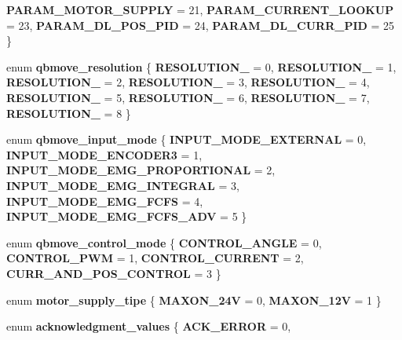\begin{DoxyCompactItemize}
\newline
\textbf{ P\+A\+R\+A\+M\+\_\+\+M\+O\+T\+O\+R\+\_\+\+S\+U\+P\+P\+LY} = 21, 
\textbf{ P\+A\+R\+A\+M\+\_\+\+C\+U\+R\+R\+E\+N\+T\+\_\+\+L\+O\+O\+K\+UP} = 23, 
\textbf{ P\+A\+R\+A\+M\+\_\+\+D\+L\+\_\+\+P\+O\+S\+\_\+\+P\+ID} = 24, 
\textbf{ P\+A\+R\+A\+M\+\_\+\+D\+L\+\_\+\+C\+U\+R\+R\+\_\+\+P\+ID} = 25
 \}
\item 
\mbox{\label{commands_8h_ad18f2ef316ee226b52882af5758c39e8}} 
enum {\bfseries qbmove\+\_\+resolution} \{ \newline
{\bfseries R\+E\+S\+O\+L\+U\+T\+I\+O\+N\+\_} = 0, 
{\bfseries R\+E\+S\+O\+L\+U\+T\+I\+O\+N\+\_} = 1, 
{\bfseries R\+E\+S\+O\+L\+U\+T\+I\+O\+N\+\_} = 2, 
{\bfseries R\+E\+S\+O\+L\+U\+T\+I\+O\+N\+\_} = 3, 
\newline
{\bfseries R\+E\+S\+O\+L\+U\+T\+I\+O\+N\+\_} = 4, 
{\bfseries R\+E\+S\+O\+L\+U\+T\+I\+O\+N\+\_} = 5, 
{\bfseries R\+E\+S\+O\+L\+U\+T\+I\+O\+N\+\_} = 6, 
{\bfseries R\+E\+S\+O\+L\+U\+T\+I\+O\+N\+\_} = 7, 
\newline
{\bfseries R\+E\+S\+O\+L\+U\+T\+I\+O\+N\+\_} = 8
 \}
\item 
enum \textbf{ qbmove\+\_\+input\+\_\+mode} \{ \newline
\textbf{ I\+N\+P\+U\+T\+\_\+\+M\+O\+D\+E\+\_\+\+E\+X\+T\+E\+R\+N\+AL} = 0, 
\textbf{ I\+N\+P\+U\+T\+\_\+\+M\+O\+D\+E\+\_\+\+E\+N\+C\+O\+D\+E\+R3} = 1, 
\textbf{ I\+N\+P\+U\+T\+\_\+\+M\+O\+D\+E\+\_\+\+E\+M\+G\+\_\+\+P\+R\+O\+P\+O\+R\+T\+I\+O\+N\+AL} = 2, 
\textbf{ I\+N\+P\+U\+T\+\_\+\+M\+O\+D\+E\+\_\+\+E\+M\+G\+\_\+\+I\+N\+T\+E\+G\+R\+AL} = 3, 
\newline
\textbf{ I\+N\+P\+U\+T\+\_\+\+M\+O\+D\+E\+\_\+\+E\+M\+G\+\_\+\+F\+C\+FS} = 4, 
\textbf{ I\+N\+P\+U\+T\+\_\+\+M\+O\+D\+E\+\_\+\+E\+M\+G\+\_\+\+F\+C\+F\+S\+\_\+\+A\+DV} = 5
 \}
\item 
enum \textbf{ qbmove\+\_\+control\+\_\+mode} \{ \textbf{ C\+O\+N\+T\+R\+O\+L\+\_\+\+A\+N\+G\+LE} = 0, 
\textbf{ C\+O\+N\+T\+R\+O\+L\+\_\+\+P\+WM} = 1, 
\textbf{ C\+O\+N\+T\+R\+O\+L\+\_\+\+C\+U\+R\+R\+E\+NT} = 2, 
\textbf{ C\+U\+R\+R\+\_\+\+A\+N\+D\+\_\+\+P\+O\+S\+\_\+\+C\+O\+N\+T\+R\+OL} = 3
 \}
\item 
\mbox{\label{commands_8h_a17c218160a8b2c5f25db27616793d564}} 
enum {\bfseries motor\+\_\+supply\+\_\+tipe} \{ {\bfseries M\+A\+X\+O\+N\+\_\+24V} = 0, 
{\bfseries M\+A\+X\+O\+N\+\_\+12V} = 1
 \}
\item 
\mbox{\label{commands_8h_a0eae1c82d20671c5d0b9b82b10070f1b}} 
enum {\bfseries acknowledgment\+\_\+values} \{ {\bfseries A\+C\+K\+\_\+\+E\+R\+R\+OR} = 0, 

\end{DoxyCompactItemize}
